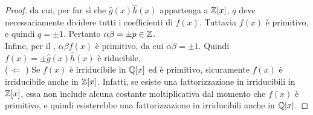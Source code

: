 \documentclass[11pt]{scrbook}
\begin{document}
\begin{proof}
    da cui, per far sì che $\hat{g}(x) \hat{h}(x)$ appartenga
    a $\mathbb{Z}[x]$, $q$ deve necessariamente dividere tutti i
    coefficienti di $f(x)$. Tuttavia $f(x)$ è primitivo, e quindi
    $q=\pm 1$. Pertanto $\alpha \beta = \pm p \in \mathbb Z$. \\

    Infine, per il , $\alpha \beta f(x)$
    è primitivo, da cui $\alpha \beta = \pm 1$. Quindi
    $f(x) = \pm \hat{g}(x) \hat{h}(x)$ è riducibile. \\

    ($\,\Longleftarrow\,\,$)\; Se $f(x)$ è irriducibile in $\mathbb{Q}[x]$
    ed è primitivo, sicuramente $f(x)$ è irriducibile anche in
    $\mathbb{Z}[x]$. Infatti, se esiste una fattorizzazione in
    irriducibili in $\mathbb{Z}[x]$, essa non include alcuna costante
    moltiplicativa dal momento che $f(x)$ è primitivo, e quindi
    esisterebbe una fattorizzazione in irriducibili anche in $\mathbb{Q}[x]$.
\end{proof}
\end{document}
